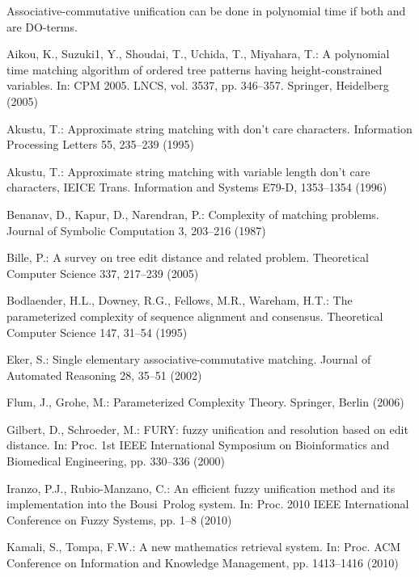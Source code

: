 \documentclass[a4paper]{llncs}
\begin{document}
\begin{proposition}
Associative-commutative unification
can be done in polynomial time if both  and  are DO-terms.
\label{prop:do-ac-unif}
\end{proposition}

\begin{thebibliography}{99}

Aikou, K., Suzuki1, Y., Shoudai, T., Uchida, T., Miyahara, T.:
A polynomial time matching algorithm
of ordered tree patterns having height-constrained variables.
In: CPM 2005. LNCS, vol. 3537, pp. 346--357.
Springer, Heidelberg (2005)

Akustu, T.:
Approximate string matching with don't care characters.
Information Processing Letters 55, 235--239 (1995)

Akustu, T.:
Approximate string matching with variable length don't care characters,
IEICE Trans. Information and Systems E79-D, 1353--1354 (1996)


Benanav, D., Kapur, D., Narendran, P.:
Complexity of matching problems.
Journal of Symbolic Computation 3, 203--216 (1987)

Bille, P.:
A survey on tree edit distance and related problem.
Theoretical Computer Science 337, 217--239 (2005)

Bodlaender, H.L., Downey, R.G., Fellows, M.R., Wareham, H.T.:
The parameterized complexity of sequence alignment and consensus.
Theoretical Computer Science 147, 31--54 (1995)


Eker, S.:
Single elementary associative-commutative matching.
Journal of Automated Reasoning 28, 35--51 (2002)

Flum, J., Grohe, M.:
Parameterized Complexity Theory.
Springer, Berlin (2006)

Gilbert, D., Schroeder, M.:
FURY: fuzzy unification and resolution based on edit distance.
In: Proc. 1st IEEE International Symposium on Bioinformatics
and Biomedical Engineering, pp. 330--336 (2000)

Iranzo, P.J., Rubio-Manzano, C.:
An efficient fuzzy unification method and its implementation
into the Bousi~Prolog system.
In: Proc. 2010 IEEE International Conference on Fuzzy Systems,
pp. 1--8 (2010)

Kamali, S., Tompa, F.W.:
A new mathematics retrieval system.
In: Proc. ACM Conference on Information and Knowledge Management,
pp. 1413--1416 (2010)


\end{thebibliography}
\end{document}
